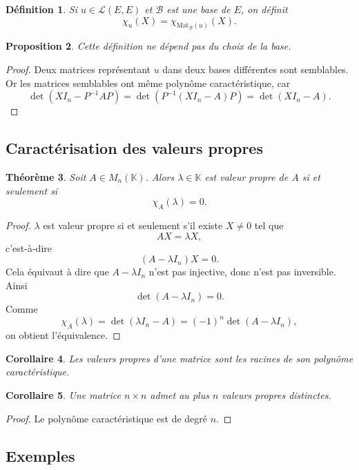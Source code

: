 \documentclass[11pt,a4paper]{article}
\newtheorem{definition}{Définition}[section]
\newtheorem{theoreme}[definition]{Théorème}
\newtheorem{proposition}[definition]{Proposition}
\newtheorem{corollaire}[definition]{Corollaire}
\theoremstyle{remark}
\newcommand{\K}{\mathbb{K}}
\newcommand{\chiA}{\chi_A}
\begin{document}
\begin{definition}
Si \(u\in\mathcal L(E,E)\) et \(\mathcal B\) est une base de \(E\), on définit
\[
\chi_u(X)=\chi_{\mathrm{Mat}_{\mathcal B}(u)}(X).
\]
\end{definition}

\begin{proposition}
Cette définition ne dépend pas du choix de la base.
\end{proposition}

\begin{proof}
Deux matrices représentant \(u\) dans deux bases différentes sont semblables. Or les matrices semblables ont même polynôme caractéristique, car
\[
\det(XI_n-P^{-1}AP)=\det(P^{-1}(XI_n-A)P)=\det(XI_n-A).
\]
\end{proof}

\subsection{Caractérisation des valeurs propres}

\begin{theoreme}
Soit \(A\in M_n(\K)\). Alors \(\lambda\in\K\) est valeur propre de \(A\) si et seulement si
\[
\chiA(\lambda)=0.
\]
\end{theoreme}

\begin{proof}
\(\lambda\) est valeur propre si et seulement s’il existe \(X\neq 0\) tel que
\[
AX=\lambda X,
\]
c’est-à-dire
\[
(A-\lambda I_n)X=0.
\]
Cela équivaut à dire que \(A-\lambda I_n\) n’est pas injective, donc n’est pas inversible. Ainsi
\[
\det(A-\lambda I_n)=0.
\]
Comme
\[
\chiA(\lambda)=\det(\lambda I_n-A)=(-1)^n\det(A-\lambda I_n),
\]
on obtient l’équivalence.
\end{proof}

\begin{corollaire}
Les valeurs propres d’une matrice sont les racines de son polynôme caractéristique.
\end{corollaire}

\begin{corollaire}
Une matrice \(n\times n\) admet au plus \(n\) valeurs propres distinctes.
\end{corollaire}

\begin{proof}
Le polynôme caractéristique est de degré \(n\).
\end{proof}

\subsection{Exemples}
\end{document}
